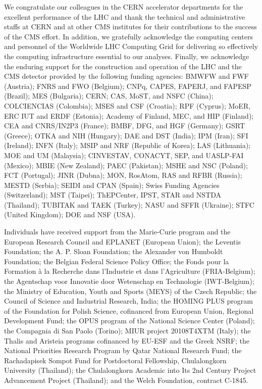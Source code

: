 \begin{frontmatter}
\begin{acknowledgements}                                                       
We congratulate our colleagues in the CERN accelerator departments for the excellent performance of the LHC and thank the technical
and administrative staffs at CERN and at other CMS institutes for their contributions to the success of
 the CMS effort. In addition, we gratefully acknowledge the computing centers and personnel of the
Worldwide LHC Computing Grid for delivering so effectively the computing infrastructure essential to our analyses. Finally, we acknowledge
the enduring support for the construction and operation of the LHC and the CMS detector provided by the following funding agencies:
BMWFW and FWF (Austria); FNRS and FWO (Belgium); CNPq, CAPES, FAPERJ, and FAPESP (Brazil); MES (Bulgaria);
CERN; CAS, MoST, and NSFC (China); COLCIENCIAS (Colombia); MSES and CSF (Croatia); RPF (Cyprus); MoER, ERC IUT and ERDF (Estonia);
Academy of Finland, MEC, and HIP (Finland); CEA and CNRS/IN2P3 (France); BMBF, DFG, and HGF (Germany); GSRT (Greece); OTKA and
NIH (Hungary); DAE and DST (India); IPM (Iran); SFI (Ireland); INFN (Italy); MSIP and NRF (Republic of Korea); LAS (Lithuania);
MOE and UM (Malaysia); CINVESTAV, CONACYT, SEP, and UASLP-FAI (Mexico); MBIE
(New Zealand); PAEC (Pakistan); MSHE and NSC (Poland); FCT (Portugal); JINR (Dubna); MON, RosAtom, RAS and RFBR (Russia); MESTD (Serbia);
SEIDI and CPAN (Spain); Swiss Funding Agencies (Switzerland); MST (Taipei); ThEPCenter, IPST, STAR and NSTDA (Thailand);
TUBITAK and TAEK (Turkey); NASU and SFFR (Ukraine); STFC (United Kingdom); DOE and NSF (USA).

Individuals have received support from the Marie-Curie program and the European Research Council and EPLANET (European Union);
the Leventis Foundation; the A. P. Sloan Foundation; the Alexander von Humboldt Foundation; the Belgian Federal Science
Policy Office; the Fonds pour la Formation \`a la Recherche dans l'Industrie et dans l'Agriculture (FRIA-Belgium); the Agentschap
voor Innovatie door Wetenschap en Technologie (IWT-Belgium); the Ministry of Education, Youth and Sports (MEYS) of the Czech Republic;
the Council of Science and Industrial Research, India; the HOMING PLUS program of the Foundation for Polish Science, cofinanced from
European Union, Regional Development Fund; the OPUS program of the National Science Center (Poland); the Compagnia di San Paolo (Torino);
MIUR project 20108T4XTM (Italy); the Thalis and Aristeia programs cofinanced by EU-ESF and the Greek NSRF; the National Priorities
Research Program by Qatar National Research Fund; the Rachadapisek Sompot Fund for Postdoctoral Fellowship, Chulalongkorn
University (Thailand); the Chulalongkorn Academic into Its 2nd Century Project Advancement Project (Thailand); and the Welch Foundation,
contract C-1845.
\end{acknowledgements}                                                         


\end{frontmatter}
